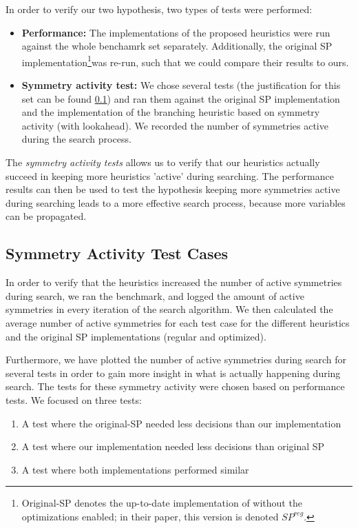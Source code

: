 
In order to verify our two hypothesis, two types of tests were performed:

\begin{itemize}
	\item {\bf Performance:}
		The implementations of the proposed heuristics were run against the whole
		benchamrk set separately.
		Additionally, the original SP implementation\footnote{
			Original-SP denotes the up-to-date implementation of \cite{devriendt2012symmetry}
			without the optimizations enabled; in their paper, this version is denoted $SP^{reg}$.
		}was re-run, such that we could compare their results to ours.

	\item {\bf Symmetry activity test:}
		We chose several tests (the justification for this set can be found
		\ref{ssec:sym_act_test_cases}) and ran them against the original SP implementation and the
		implementation of the branching heuristic based on symmetry activity (with lookahead).
		We recorded the number of symmetries active during the search process.

\end{itemize}

The \emph{symmetry activity tests} allows us to verify that our heuristics actually succeed in
keeping more heuristics 'active' during searching.
The performance results can then be used to test the hypothesis
keeping more symmetries active during searching leads to a more effective search process,
because more variables can be propagated.

\subsection{Symmetry Activity Test Cases}
\label{ssec:sym_act_test_cases}
	In order to verify that the heuristics increased the number of active symmetries during search,
	we ran the benchmark, and logged the amount of active symmetries in every iteration of the
	search algorithm.
	We then calculated the average number of active symmetries for each test case for the different
	heuristics and the original SP implementations (regular and optimized).

	Furthermore, we have plotted the number of active symmetries during search for several tests in
	order to gain more insight in what is actually happening during search.
	The tests for these symmetry activity were chosen based on performance tests.
	We focused on three tests:
	\begin{enumerate}
		\item A test where the original-SP needed less decisions than our implementation
		\item A test where our implementation needed less decisions than original SP
		\item A test where both implementations performed similar
	\end{enumerate}

